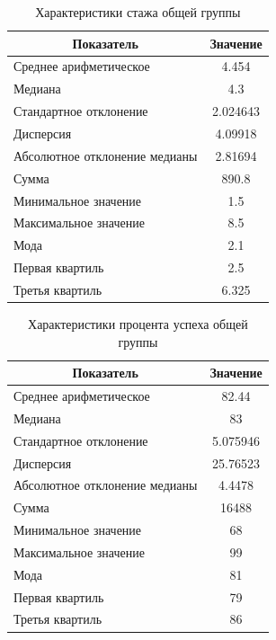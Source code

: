 \begin{table}[H]
	\centering
	\caption{Характеристики стажа общей группы}
	\begin{tabular}{|l|c|}
		\hline
		\multicolumn{1}{|c|}{\textbf{Показатель}} & \textbf{Значение}\\ \hline
		Среднее арифметическое        & 4.454    \\ \hline
		Медиана                       & 4.3      \\ \hline
		Стандартное отклонение        & 2.024643 \\ \hline
		Дисперсия                      & 4.09918  \\ \hline
		Абсолютное отклонение медианы & 2.81694  \\ \hline
		Сумма                         & 890.8    \\ \hline
		Минимальное значение          & 1.5      \\ \hline
		Максимальное значение         & 8.5      \\ \hline
		Мода & 2.1 \\ \hline
		Первая квартиль & 2.5 \\ \hline
		Третья квартиль & 6.325 \\ \hline
	\end{tabular}
\end{table}


\begin{table}[H]
	\centering
	\caption{Характеристики процента успеха общей группы}
	\begin{tabular}{|l|c|}
		\hline
		\multicolumn{1}{|c|}{\textbf{Показатель}} & \textbf{Значение}\\ \hline
		Среднее арифметическое        & 82.44    \\ \hline
		Медиана                       & 83       \\ \hline
		Стандартное отклонение        & 5.075946 \\ \hline
		Дисперсия                      & 25.76523 \\ \hline
		Абсолютное отклонение медианы & 4.4478   \\ \hline
		Сумма                         & 16488    \\ \hline
		Минимальное значение          & 68       \\ \hline
		Максимальное значение         & 99       \\ \hline
		Мода & 81 \\ \hline
		Первая квартиль & 79 \\ \hline
		Третья квартиль & 86 \\ \hline
	\end{tabular}
\end{table}


